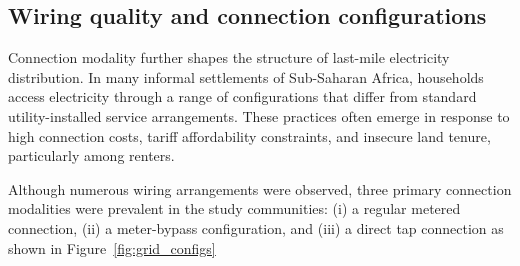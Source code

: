 \documentclass[review]{elsarticle}
\begin{document}

\subsection{Wiring quality and connection configurations }
Connection modality further shapes the structure of last-mile electricity distribution. In many informal settlements of Sub-Saharan Africa, households access electricity through a range of configurations that differ from standard utility-installed service arrangements. These practices often emerge in response to high connection costs, tariff affordability constraints, and insecure land tenure, particularly among renters.

Although numerous wiring arrangements were observed, three primary connection modalities were prevalent in the study communities: (i) a regular metered connection, (ii) a meter-bypass configuration, and (iii) a direct tap connection as shown in  Figure~\ref{fig:grid_configs}
\end{document}
